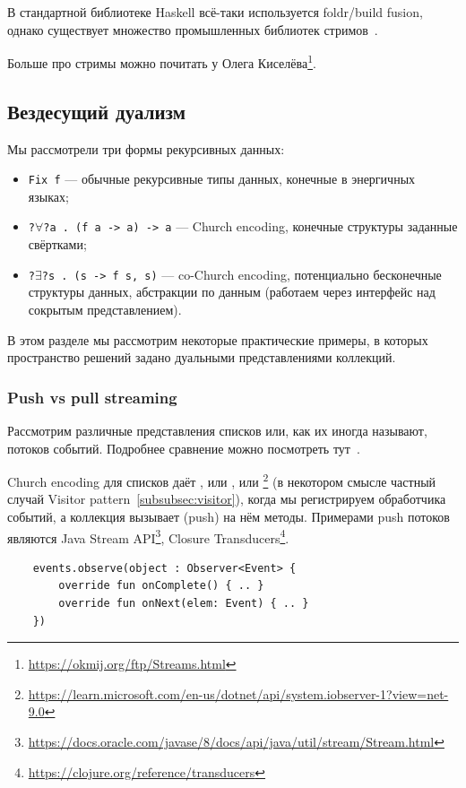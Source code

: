 В стандартной библиотеке Haskell всё-таки используется foldr/build fusion, однако существует множество промышленных библиотек стримов~\cite[глава 14]{bragilevsky-haskell}.

Больше про стримы можно почитать у Олега Киселёва\footnote{\url{https://okmij.org/ftp/Streams.html}}.

\subsection{Вездесущий дуализм} \label{subsec:data-duality}

Мы рассмотрели три формы рекурсивных данных:
\begin{itemize}
    \item \texttt{Fix f} --- обычные рекурсивные типы данных, конечные в энергичных языках;
    \item \texttt{?$\forall$?a . (f a -> a) -> a} --- Church encoding, конечные структуры заданные свёртками;
    \item \texttt{?$\exists$?s . (s -> f s, s)} --- co-Church encoding, потенциально бесконечные структуры данных, абстракции по данным (работаем через интерфейс над сокрытым представлением).
\end{itemize}

В этом разделе мы рассмотрим некоторые практические примеры, в которых пространство решений задано дуальными представлениями коллекций.

\subsubsection{Push vs pull streaming} \label{subsubsec:push-pull}

Рассмотрим различные представления списков или, как их иногда называют, потоков событий.
Подробнее сравнение можно посмотреть тут~\cite[параграф 3]{kiselyov2017stream}.

Church encoding для списков даёт , или , или \footnote{\url{https://learn.microsoft.com/en-us/dotnet/api/system.iobserver-1?view=net-9.0}} (в некотором смысле частный случай Visitor pattern~\ref{subsubsec:visitor}), когда мы регистрируем обработчика событий, а коллекция вызывает (push) на нём методы.
Примерами push потоков являются Java Stream API\footnote{\url{https://docs.oracle.com/javase/8/docs/api/java/util/stream/Stream.html}}, Closure Transducers\footnote{\url{https://clojure.org/reference/transducers}}.
\begin{verbatim}
    events.observe(object : Observer<Event> {
        override fun onComplete() { .. }
        override fun onNext(elem: Event) { .. }
    })
\end{verbatim}

